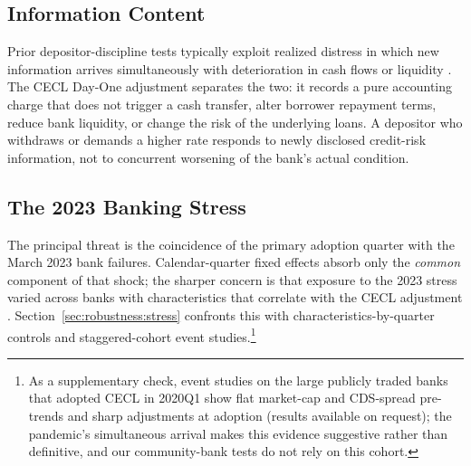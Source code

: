 \subsection{Information Content}
\label{sec:identification:mechanism}

Prior depositor-discipline tests typically exploit realized distress in
which new information arrives simultaneously with deterioration in cash
flows or liquidity \citep{flannery1996evidence, martinez2001depositors,
iyer2016tale}.  The CECL Day-One adjustment separates the two: it
records a pure accounting charge that does not trigger a cash transfer,
alter borrower repayment terms, reduce bank liquidity, or change the
risk of the underlying loans.  A depositor who withdraws or demands a
higher rate responds to newly disclosed credit-risk information, not to
concurrent worsening of the bank's actual condition.

\subsection{The 2023 Banking Stress}
\label{sec:identification:stress}

The principal threat is the coincidence of the primary adoption quarter
with the March 2023 bank failures.  Calendar-quarter fixed effects
absorb only the \emph{common} component of that shock; the sharper
concern is that exposure to the 2023 stress varied across banks with
characteristics that correlate with the CECL adjustment
\citep{caglio2024depositors, jiang2024monetary}.
Section~\ref{sec:robustness:stress} confronts this with
characteristics-by-quarter controls and staggered-cohort event
studies.\footnote{As a supplementary check, event studies on the large
publicly traded banks that adopted CECL in 2020Q1 show flat market-cap
and CDS-spread pre-trends and sharp adjustments at adoption (results
available on request); the pandemic's simultaneous arrival makes this
evidence suggestive rather than definitive, and our community-bank tests
do not rely on this cohort.}
